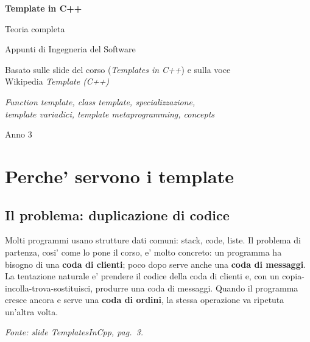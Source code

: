 \documentclass{report}
\newcommand{\fonteslide}[1]{{\footnotesize\itshape\color{gray} Fonte: slide \emph{TemplatesInCpp}, pag.~#1.\par}}
\begin{document}
\begin{titlepage}
    \centering
    \vspace*{2.5cm}
    {\Huge\sffamily\bfseries Template in C++\par}
    \vspace{0.5cm}
    {\LARGE\sffamily Teoria completa\par}
    \vspace{1.4cm}
    {\Large Appunti di Ingegneria del Software\par}
    \vspace{0.4cm}
    {\large Basato sulle slide del corso (\emph{Templates in C++}) e sulla voce\\
    Wikipedia \emph{Template (C++)}\par}
    \vspace{2cm}
    {\large\itshape Function template, class template, specializzazione,\\
    template variadici, template metaprogramming, concepts\par}
    \vfill
    {\large Anno 3\par}
\end{titlepage}

\tableofcontents
\newpage

\chapter{Perche' servono i template}\label{ch:perche}

\section{Il problema: duplicazione di codice}

Molti programmi usano strutture dati comuni: stack, code, liste. Il problema
di partenza, cosi' come lo pone il corso, e' molto concreto: un programma ha
bisogno di una \textbf{coda di clienti}; poco dopo serve anche una
\textbf{coda di messaggi}. La tentazione naturale e' prendere il codice della
coda di clienti e, con un copia-incolla-trova-sostituisci, produrre una coda
di messaggi. Quando il programma cresce ancora e serve una \textbf{coda di
ordini}, la stessa operazione va ripetuta un'altra volta.

\fonteslide{3}

\end{document}
